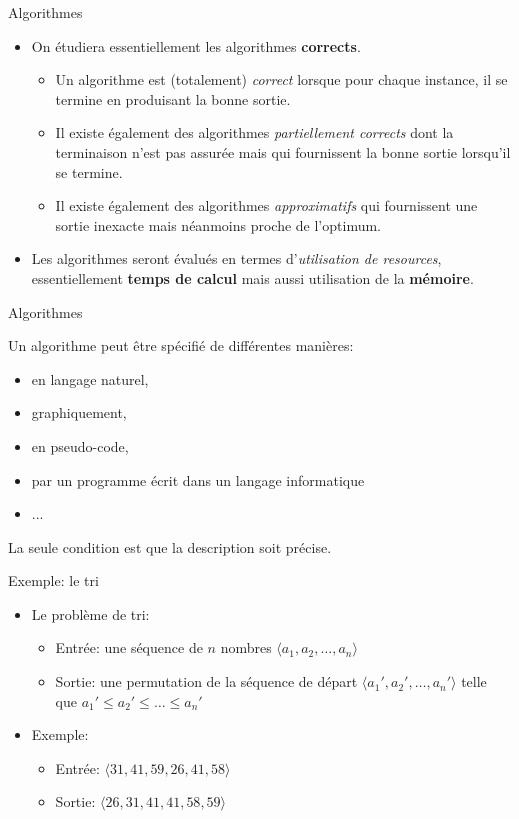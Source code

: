 \begin{frame}{Algorithmes}
\begin{itemize}
\item On étudiera essentiellement les algorithmes {\bf corrects}.
\begin{itemize}
\item Un algorithme est (totalement) {\em correct} lorsque pour chaque instance, il se termine en produisant la bonne sortie.
\item Il existe également des algorithmes {\em partiellement corrects} dont la terminaison n'est pas assurée mais qui fournissent la bonne sortie lorsqu'il se termine.
\item Il existe également des algorithmes {\em approximatifs} qui fournissent une sortie inexacte mais néanmoins proche de l'optimum.
\end{itemize}
\bigskip
\item Les algorithmes seront évalués en termes d'{\em utilisation de resources}, essentiellement {\bf temps de calcul} mais aussi utilisation de la {\bf mémoire}.
\end{itemize}
\end{frame}

\begin{frame}{Algorithmes}

Un algorithme peut être spécifié de différentes manières:
\begin{itemize}
\item en langage naturel,
\item graphiquement,
\item en pseudo-code,
\item par un programme écrit dans un langage informatique
\item ...
\end{itemize}
La seule condition est que la description soit précise.

\end{frame}


\begin{frame}{Exemple: le tri}
\begin{itemize}
\item Le problème de tri:
\begin{itemize}
\item Entrée: une séquence de $n$ nombres $\langle a_1,a_2,\ldots,a_n\rangle$
\item Sortie: une permutation de la séquence de départ $\langle a_1',a_2',\ldots,a_n'\rangle$ telle que $a_1'\leq a_2'\leq\ldots\leq a_n'$
\end{itemize}
\bigskip
\item Exemple:
\begin{itemize}
\item Entrée: $\langle 31,41,59,26,41,58\rangle$
\item Sortie: $\langle 26,31,41,41,58,59\rangle$
\end{itemize}
\end{itemize}

\end{frame}

